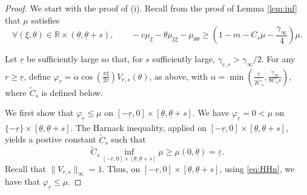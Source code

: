 \documentclass[11pt]{article}    %
\newcommand{\R}{\mathbb{R}}
\newcommand{\eps}{\varepsilon}
\begin{document}
\begin{proof}%
We start with the proof of (i).  Recall from the proof of Lemma \ref{lem:inf} that $\mu$ satisfies %
\begin{equation}\label{eq:mu_local_eqn}
\forall \left( \xi , \theta \right) \in \R \times (\underline\theta,\underline\theta + s), \qquad - c \mu_{\xi}  - \theta \mu_{\xi\xi} - \mu_{\theta\theta} \geq \left(1 - m - C_s \mu - \frac{\gamma_\infty}{4}  \right)\mu.
\end{equation}

Let $\underline r$ be sufficiently large so that, for $s$ sufficiently large, $\gamma_{\underline r,s}> \gamma_\infty/2$. For any $r\geq \underline r$,
 define $\varphi_r = \alpha \cos\left(\frac{\pi\xi}{2r}\right)V_{r,s}(\theta)$, as above,
with $\alpha = \min \left( \frac{\underline\eps}{2 \tilde C_s}, \frac{\gamma_\infty}{8 C_s s}  \right)$, where $\tilde C_s$ is defined below.  %

We first show that $\varphi_{\underline r}\leq \mu$ on $[- \underline r , 0] \times \left[\underline\theta,\underline\theta + s\right]$. We have $\varphi_{\underline r}  = 0 < \mu$ on $\{-\underline r\} \times \left[\underline\theta,\underline\theta + s\right]$. 
The Harnack inequality, applied on $[-\underline r,0] \times \left[\underline\theta,\underline\theta + s\right]$, yields a postive constant $\widetilde C_s$ such that
\begin{equation}\label{eq:HHn}
\widetilde{C}_s \inf_{[-\underline r,0] \times \left[\underline\theta,\underline\theta + s\right]} \mu \geq  \mu(0,\underline\theta) = \underline\eps.
\end{equation}
Recall that $\|V_{r,s}\|_\infty = 1$.  Thus, on $[-\underline r , 0] \times \left[\underline\theta,\underline\theta + s\right]$, using \eqref{eq:HHn}, we have that $\varphi_{\underline r} \leq \mu$.


\end{proof}
\end{document}
